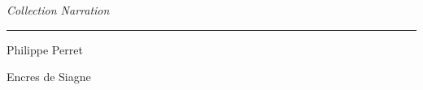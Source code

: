 
\begin{titlepage}
	\begin{center}\LARGE
		\textit{Collection Narration}
	\end{center}
	\selectfont

	\begin{flushleft}\huge\bfseries
		\titrelivre{}
	\end{flushleft}

	\hrule

	\begin{flushright}
		Philippe Perret
	\end{flushright}

	\begin{flushleft}\itshape\small
		\soustitrelivre
	\end{flushleft}
	
	\begin{center}
		Encres de Siagne
	\end{center}
\end{titlepage}

